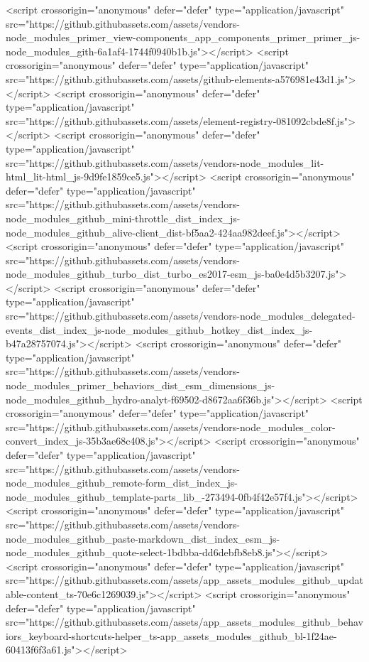 <script crossorigin="anonymous" defer="defer" type="application/javascript" src="https://github.githubassets.com/assets/vendors-node_modules_primer_view-components_app_components_primer_primer_js-node_modules_gith-6a1af4-1744f0940b1b.js"></script>
<script crossorigin="anonymous" defer="defer" type="application/javascript" src="https://github.githubassets.com/assets/github-elements-a576981e43d1.js"></script>
<script crossorigin="anonymous" defer="defer" type="application/javascript" src="https://github.githubassets.com/assets/element-registry-081092cbde8f.js"></script>
<script crossorigin="anonymous" defer="defer" type="application/javascript" src="https://github.githubassets.com/assets/vendors-node_modules_lit-html_lit-html_js-9d9fe1859ce5.js"></script>
<script crossorigin="anonymous" defer="defer" type="application/javascript" src="https://github.githubassets.com/assets/vendors-node_modules_github_mini-throttle_dist_index_js-node_modules_github_alive-client_dist-bf5aa2-424aa982deef.js"></script>
<script crossorigin="anonymous" defer="defer" type="application/javascript" src="https://github.githubassets.com/assets/vendors-node_modules_github_turbo_dist_turbo_es2017-esm_js-ba0e4d5b3207.js"></script>
<script crossorigin="anonymous" defer="defer" type="application/javascript" src="https://github.githubassets.com/assets/vendors-node_modules_delegated-events_dist_index_js-node_modules_github_hotkey_dist_index_js-b47a28757074.js"></script>
<script crossorigin="anonymous" defer="defer" type="application/javascript" src="https://github.githubassets.com/assets/vendors-node_modules_primer_behaviors_dist_esm_dimensions_js-node_modules_github_hydro-analyt-f69502-d8672aa6f36b.js"></script>
<script crossorigin="anonymous" defer="defer" type="application/javascript" src="https://github.githubassets.com/assets/vendors-node_modules_color-convert_index_js-35b3ae68c408.js"></script>
<script crossorigin="anonymous" defer="defer" type="application/javascript" src="https://github.githubassets.com/assets/vendors-node_modules_github_remote-form_dist_index_js-node_modules_github_template-parts_lib_-273494-0fb4f42e57f4.js"></script>
<script crossorigin="anonymous" defer="defer" type="application/javascript" src="https://github.githubassets.com/assets/vendors-node_modules_github_paste-markdown_dist_index_esm_js-node_modules_github_quote-select-1bdbba-dd6debfb8eb8.js"></script>
<script crossorigin="anonymous" defer="defer" type="application/javascript" src="https://github.githubassets.com/assets/app_assets_modules_github_updatable-content_ts-70e6c1269039.js"></script>
<script crossorigin="anonymous" defer="defer" type="application/javascript" src="https://github.githubassets.com/assets/app_assets_modules_github_behaviors_keyboard-shortcuts-helper_ts-app_assets_modules_github_bl-1f24ae-60413f6f3a61.js"></script>
